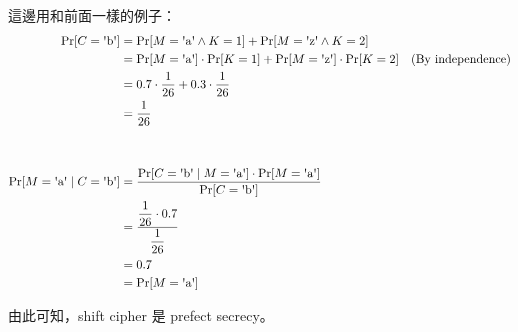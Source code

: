 這邊用和前面一樣的例子：
\begin{align*}
	\Pr[C = \letter{b}] &= 
			\Pr[M = \letter{a} \wedge K = 1] +
			\Pr[M = \letter{z} \wedge K = 2] \\
		&= \Pr[M = \letter{a}] \cdot \Pr[K = 1] + 
			\Pr[M = \letter{z}] \cdot \Pr[K = 2]
			\quad \text{(By independence)} \\
		&= 0.7 \cdot \frac{1}{26} + 0.3 \cdot \frac{1}{26} \\
		&= \frac{1}{26} \\
	& \\
	& \\
	\Pr[M = \letter{a} \mid C =  \letter{b}] &=
	\frac{\Pr[C = \letter{b} \mid M = \letter{a}] \cdot \Pr[M = \letter{a}]}{\Pr[C = \letter{b}]} \\
	&= \frac{\displaystyle{\frac{1}{26}} \cdot 0.7}{\displaystyle{\frac{1}{26}}} \\
	&= 0.7 \\
	&= \Pr[M = \letter{a}]
\end{align*}

由此可知，shift cipher 是 prefect secrecy。

